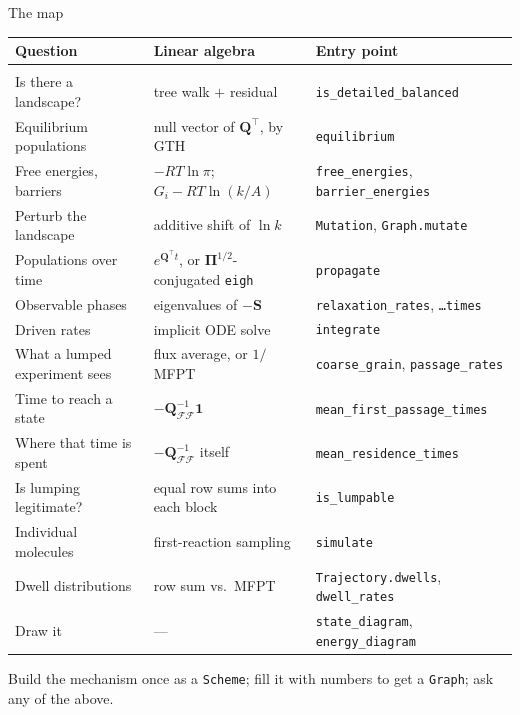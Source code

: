 \documentclass[10pt,aspectratio=169]{beamer}
\newcommand{\Q}{\bm{Q}}
\newcommand{\code}[1]{\texttt{\small #1}}
\begin{document}
\begin{frame}{The map}
  \scriptsize
  \begin{tabular}{@{}lll@{}}
    \textbf{Question} & \textbf{Linear algebra} & \textbf{Entry point}\\[2pt]
    \hline\\[-6pt]
    Is there a landscape? & tree walk $+$ residual &
      \code{is\_detailed\_balanced}\\
    Equilibrium populations & null vector of $\Q^{\!\top}$, by GTH &
      \code{equilibrium}\\
    Free energies, barriers & $-RT\ln\pi$; $G_i-RT\ln(k/A)$ &
      \code{free\_energies}, \code{barrier\_energies}\\
    Perturb the landscape & additive shift of $\ln k$ &
      \code{Mutation}, \code{Graph.mutate}\\
    Populations over time & $e^{\Q^{\!\top}t}$, or $\bm{\Pi}^{1/2}$-conjugated
      \code{eigh} & \code{propagate}\\
    Observable phases & eigenvalues of $-\bm{S}$ &
      \code{relaxation\_rates}, \code{\dots times}\\
    Driven rates & implicit ODE solve & \code{integrate}\\
    What a lumped experiment sees & flux average, or $1/$MFPT &
      \code{coarse\_grain}, \code{passage\_rates}\\
    Time to reach a state & $-\Q_{\mathcal{F}\mathcal{F}}^{-1}\bm{1}$ &
      \code{mean\_first\_passage\_times}\\
    Where that time is spent & $-\Q_{\mathcal{F}\mathcal{F}}^{-1}$ itself &
      \code{mean\_residence\_times}\\
    Is lumping legitimate? & equal row sums into each block &
      \code{is\_lumpable}\\
    Individual molecules & first-reaction sampling &
      \code{simulate}\\
    Dwell distributions & row sum vs.\ MFPT &
      \code{Trajectory.dwells}, \code{dwell\_rates}\\
    Draw it & --- & \code{state\_diagram}, \code{energy\_diagram}\\
  \end{tabular}

  \vspace{0.8em}
  \normalsize
  Build the mechanism once as a \code{Scheme}; fill it with numbers to get a
  \code{Graph}; ask any of the above.
\end{frame}
\end{document}
